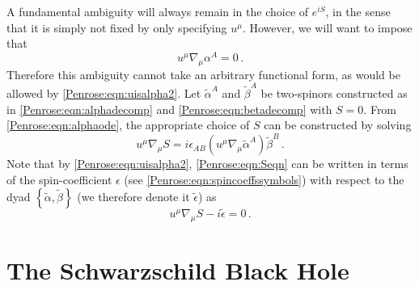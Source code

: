 A fundamental ambiguity will always remain in the choice of $e^{i S}$, in the sense that it is simply not fixed by only specifying $u^{\mu}$. However, we will want to impose that 
\begin{equation}\label{Penrose:eqn:alphaode}
u^{\mu}\nabla_{\mu} \alpha^A = 0 \, .
\end{equation}
Therefore this ambiguity cannot take an arbitrary functional form, as would be allowed by \eqref{Penrose:eqn:uisalpha2}. Let $\tilde{\alpha}^A$ and $\tilde{\beta}^A$ be two-spinors constructed as in \eqref{Penrose:eqn:alphadecomp} and \eqref{Penrose:eqn:betadecomp} with $S = 0$. From \eqref{Penrose:eqn:alphaode}, the appropriate choice of $S$ can be constructed by solving
\begin{equation}\label{Penrose:eqn:Seqn}
u^{\mu} \nabla_{\mu} S  = i\epsilon_{AB}  \left(u^{\mu}\nabla_{\mu}\tilde{\alpha}^A\right)\tilde{\beta}^B \, .
\end{equation}
Note that by \eqref{Penrose:eqn:uisalpha2}, \eqref{Penrose:eqn:Seqn} can be written in terms of the spin-coefficient $\epsilon$  (see \eqref{Penrose:eqn:spincoeffssymbols}) with respect to the dyad $\left\lbrace \tilde{\alpha}, \tilde{\beta} \right\rbrace$ (we therefore denote it $\tilde{\epsilon}$) as
\begin{equation}\label{Penrose:eqn:Seqn2}
u^{\mu} \nabla_{\mu} S  - i \tilde{\epsilon} = 0\, .
\end{equation}

\section{The Schwarzschild Black Hole}\label{Penrose:app:Schwarzschild}

